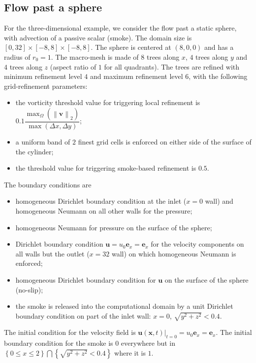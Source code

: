\documentclass[11pt, a4paper]{article}
\theoremstyle{remark}
\begin{document}
\subsection{Flow past a sphere}
\label{subsec:flow_past_sphere_check}
For the three-dimensional example, we consider the flow past a static sphere, with advection of a passive scalar (smoke). The domain size is $\left[0, 32 \right]\times \left[ -8, 8\right] \times \left[ -8, 8\right]$. The sphere is centered at $\left( 8, 0, 0 \right)$ and has a radius of $r_{0} = 1$. The macro-mesh is made of $8$ trees along $x$, $4$ trees along $y$ and $4$ trees along $z$ (aspect ratio of $1$ for all quadrants). The trees are refined with minimum refinement level $4$ and maximum refinement level $6$, with the following grid-refinement parameters:
\begin{itemize}
 \item the vorticity threshold value for triggering local refinement is $0.1\dfrac{\max_{\Omega}\left( \left\| \mathbf{v} \right\|_{2}\right)}{\max\left( \Delta x, \Delta y \right)}$;
 \item a uniform band of $2$ finest grid cells is enforced on either side of the surface of the cylinder;
 \item the threshold value for triggering smoke-based refinement is $0.5$.
\end{itemize}


The boundary conditions are 
\begin{itemize}
 \item homogeneous Dirichlet boundary condition at the inlet ($x = 0$ wall) and homogeneous Neumann on all other walls for the pressure;
 \item homogeneous Neumann for pressure on the surface of the sphere;
 \item Dirichlet boundary condition $\mathbf{u} = u_{0}\mathbf{e}_{x} = \mathbf{e}_{x}$ for the velocity components on all walls but the outlet ($x = 32$ wall) on which homogeneous Neumann is enforced;
 \item homogeneous Dirichlet boundary condition for $\mathbf{u}$ on the surface of the sphere (no-slip);
 \item the smoke is released into the computational domain by a unit Dirichlet boundary condition on part of the inlet wall: $x = 0$, $\sqrt{y^2 + z^2} < 0.4$.
\end{itemize}
The initial condition for the velocity field is $\left.\mathbf{u}\left( \mathbf{x}, t\right)\right|_{t = 0} = u_{0}\mathbf{e}_{x} = \mathbf{e}_{x}$. The initial boundary condition for the smoke is $0$ everywhere but in $\left\{ 0 \leq x \leq 2\right\} \bigcap \left\{ \sqrt{ y^2 + z^2} < 0.4\right\}$ where it is $1$.
\end{document}
